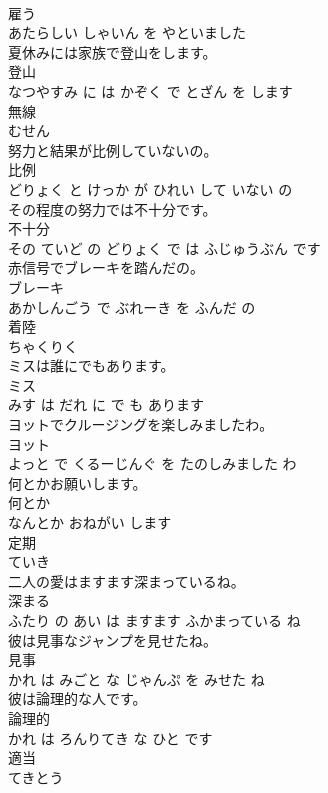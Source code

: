 \documentclass[8pt]{extreport}
\begin{document}
\begin{CJK}{UTF8}{min}
\\	雇う 
\\	あたらしい しゃいん を やといました			
\\	夏休みには家族で登山をします。	
\\	登山 
\\	なつやすみ に は かぞく で とざん を します			
\\	無線	
\\	むせん		
\\	努力と結果が比例していないの。	
\\	比例 
\\	どりょく と けっか が ひれい して いない の			
\\	その程度の努力では不十分です。	
\\	不十分 
\\	その ていど の どりょく で は ふじゅうぶん です			
\\	赤信号でブレーキを踏んだの。	
\\	ブレーキ 
\\	あかしんごう で ぶれーき を ふんだ の			
\\	着陸	
\\	ちゃくりく		
\\	ミスは誰にでもあります。	
\\	ミス 
\\	みす は だれ に で も あります			
\\	ヨットでクルージングを楽しみましたわ。	
\\	ヨット 
\\	よっと で くるーじんぐ を たのしみました わ			
\\	何とかお願いします。	
\\	何とか 
\\	なんとか おねがい します			
\\	定期	
\\	ていき		
\\	二人の愛はますます深まっているね。	
\\	深まる 
\\	ふたり の あい は ますます ふかまっている ね			
\\	彼は見事なジャンプを見せたね。	
\\	見事 
\\	かれ は みごと な じゃんぷ を みせた ね			
\\	彼は論理的な人です。	
\\	論理的 
\\	かれ は ろんりてき な ひと です			
\\	適当	
\\	てきとう		

\end{CJK}
\end{document}
